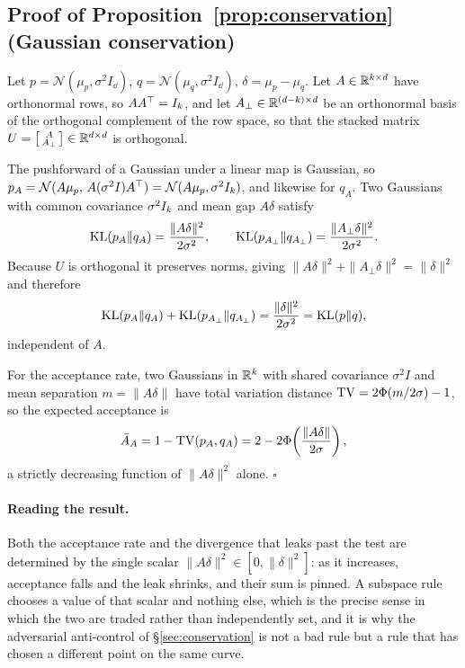 \subsection{Proof of Proposition~\ref{prop:conservation} (Gaussian conservation)}

Let $p = \mathcal{N}(\mu_p, \sigma^2 I_\dd)$, $q = \mathcal{N}(\mu_q, \sigma^2 I_\dd)$,
$\delta = \mu_p - \mu_q$. Let $A \in \mathbb{R}^{k\times d}$ have orthonormal rows, so $AA^\top = I_k$,
and let $A_\perp \in \mathbb{R}^{(d-k)\times d}$ be an orthonormal basis of the orthogonal complement of
the row space, so that the stacked matrix
$U = \left[\begin{smallmatrix} A \\ A_\perp\end{smallmatrix}\right] \in \mathbb{R}^{d\times d}$ is
orthogonal.

The pushforward of a Gaussian under a linear map is Gaussian, so
$p_A = \mathcal{N}(A\mu_p,\, A(\sigma^2 I)A^\top) = \mathcal{N}(A\mu_p, \sigma^2 I_k)$, and likewise
for $q_A$. Two Gaussians with common covariance $\sigma^2 I_k$ and mean gap $A\delta$ satisfy
\[
\operatorname{KL}(p_A \| q_A) = \frac{\|A\delta\|^2}{2\sigma^2}, \qquad
\operatorname{KL}(p_{A_\perp} \| q_{A_\perp}) = \frac{\|A_\perp\delta\|^2}{2\sigma^2}.
\]
Because $U$ is orthogonal it preserves norms, giving
$\|A\delta\|^2 + \|A_\perp\delta\|^2 = \|\delta\|^2$ and therefore
\[
\operatorname{KL}(p_A \| q_A) + \operatorname{KL}(p_{A_\perp} \| q_{A_\perp}) = \frac{\|\delta\|^2}{2\sigma^2} = \operatorname{KL}(p \| q),
\]
independent of $A$.

For the acceptance rate, two Gaussians in $\mathbb{R}^k$ with shared covariance $\sigma^2 I$ and mean
separation $m = \|A\delta\|$ have total variation distance $\operatorname{TV} = 2\Phi(m/2\sigma) - 1$, so the
expected acceptance is
\[
\bar{A}_A = 1 - \operatorname{TV}(p_A, q_A) = 2 - 2\Phi\!\left(\frac{\|A\delta\|}{2\sigma}\right),
\]
a strictly decreasing function of $\|A\delta\|^2$ alone. $\square$

\paragraph{Reading the result.} Both the acceptance rate and the divergence that leaks past the test
are determined by the single scalar $\|A\delta\|^2 \in [0, \|\delta\|^2]$: as it increases, acceptance
falls and the leak shrinks, and their sum is pinned. A subspace rule chooses a value of that scalar
and nothing else, which is the precise sense in which the two are traded rather than independently
set, and it is why the adversarial anti-control of \S\ref{sec:conservation} is not a bad rule but a
rule that has chosen a different point on the same curve.

